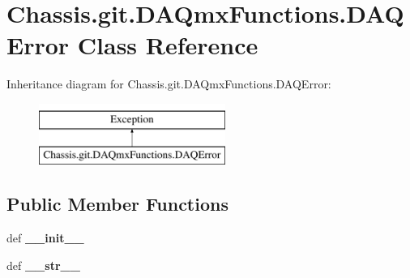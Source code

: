 \hypertarget{class_chassis_8git_1_1_d_a_qmx_functions_1_1_d_a_q_error}{\section{Chassis.\-git.\-D\-A\-Qmx\-Functions.\-D\-A\-Q\-Error Class Reference}
\label{class_chassis_8git_1_1_d_a_qmx_functions_1_1_d_a_q_error}
}
Inheritance diagram for Chassis.\-git.\-D\-A\-Qmx\-Functions.\-D\-A\-Q\-Error\-:\begin{figure}[H]
\begin{center}
\leavevmode
\includegraphics[height=2.000000cm]{class_chassis_8git_1_1_d_a_qmx_functions_1_1_d_a_q_error}
\end{center}
\end{figure}
\subsection*{Public Member Functions}
\begin{DoxyCompactItemize}
\item 
\hypertarget{class_chassis_8git_1_1_d_a_qmx_functions_1_1_d_a_q_error_a313c436c0d0205a2cddf50147c4ed586}{def {\bfseries \-\_\-\-\_\-init\-\_\-\-\_\-}}\label{class_chassis_8git_1_1_d_a_qmx_functions_1_1_d_a_q_error_a313c436c0d0205a2cddf50147c4ed586}

\item 
\hypertarget{class_chassis_8git_1_1_d_a_qmx_functions_1_1_d_a_q_error_aed996e322e34729101ef5514f842b4e9}{def {\bfseries \-\_\-\-\_\-str\-\_\-\-\_\-}}\label{class_chassis_8git_1_1_d_a_qmx_functions_1_1_d_a_q_error_aed996e322e34729101ef5514f842b4e9}

\end{DoxyCompactItemize}
